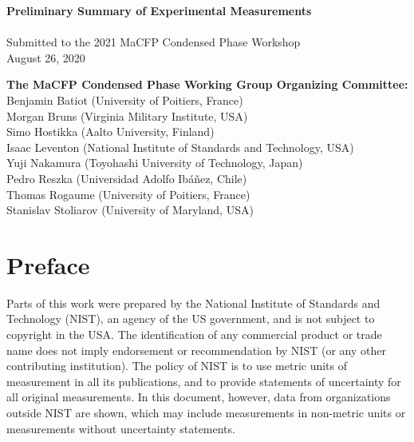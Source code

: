 \documentclass{book}
\begin{document}
\pagestyle{empty}

\vspace*{2in}

\begin{center}
{\bf Preliminary Summary of Experimental Measurements} \\
\hspace{1in} \\
Submitted to the 2021 MaCFP Condensed Phase Workshop \\
August 26, 2020 \\
\end{center}

\vfill

\begin{flushright}
{\bf The MaCFP Condensed Phase Working Group Organizing Committee:} \\
Benjamin Batiot (University of Poitiers, France) \\
Morgan Bruns (Virginia Military Institute, USA) \\
Simo Hostikka (Aalto University, Finland) \\
Isaac Leventon (National Institute of Standards and Technology, USA) \\
Yuji Nakamura (Toyohashi University of Technology, Japan) \\
Pedro Reszka (Universidad Adolfo Ibáñez, Chile) \\
Thomas Rogaume (University of Poitiers, France) \\
Stanislav Stoliarov (University of Maryland, USA)
\end{flushright}

\newpage

\frontmatter


\chapter{Preface}

Parts of this work were prepared by the National Institute of Standards and Technology (NIST), an agency of the US government, and is not subject to copyright in the USA. The identification of any commercial product or trade name does not imply endorsement or recommendation by NIST (or any other contributing institution). The policy of NIST is to use metric units of measurement in all its publications, and to provide statements of uncertainty for all original measurements. In this document, however, data from organizations outside NIST are shown, which may include measurements in non-metric units or measurements without uncertainty statements.
\end{document}
